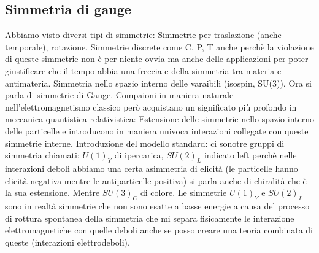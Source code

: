 \subsection{Simmetria di gauge}
Abbiamo visto diversi tipi di simmetrie: Simmetrie per traslazione (anche temporale), rotazione. Simmetrie discrete come C, P, T anche perchè la violazione di queste simmetrie non è per niente ovvia ma anche delle applicazioni per poter giustificare che il tempo abbia una freccia e della simmetria tra materia e antimateria. Simmetria nello spazio interno delle varaibili (isospin, SU(3)). Ora si parla di simmetrie di Gauge. Compaioni in maniera naturale nell'elettromagnetismo classico però acquistano un significato più profondo in meccanica quantistica relativistica: Estensione delle simmetrie nello spazio interno delle particelle e introducono in maniera univoca interazioni collegate con queste simmetrie interne. Introduzione del modello standard: ci sonotre gruppi di simmetria chiamati: $U(1)_Y$ di ipercarica, $SU(2)_L$ indicato left perchè nelle interazioni deboli abbiamo una certa asimmetria di elicità (le particelle hanno elicità negativa mentre le antiparticelle positiva) si parla anche di chiralità che è la sua estensione. Mentre $SU(3)_C$ di colore. Le simmetrie $U(1)_Y$ e $SU(2)_L$ sono in realtà simmetrie che non sono esatte a basse energie a causa del processo di rottura spontanea della simmetria che mi separa fisicamente le interazione elettromagnetiche con quelle deboli anche se posso creare una teoria combinata di queste (interazioni elettrodeboli). 

